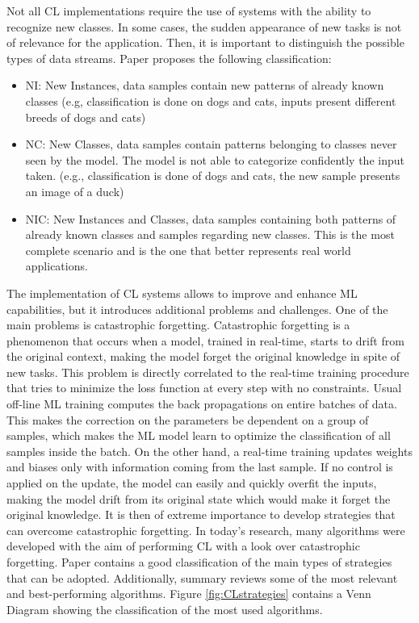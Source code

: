 \documentclass[12pt]{report}
\begin{document}
Not all CL implementations require the use of systems with the ability to recognize new classes. In some cases, the sudden appearance of new tasks is not of relevance for the application. Then, it is important to distinguish the possible types of data streams. Paper \cite{maltoni2019continuous} proposes the following classification:\\

\begin{itemize}
\item NI: New Instances, data samples contain new patterns of already known classes (e.g, classification is done on dogs and cats, inputs present different breeds of dogs and cats)
\item NC: New Classes, data samples contain patterns belonging to classes never seen by the model. The model is not able to categorize confidently the input taken. (e.g., classification is done of dogs and cats, the new sample presents an image of a duck)
\item NIC: New Instances and Classes, data samples containing both patterns of already known classes and samples regarding new classes. This is the most complete scenario and is the one that better represents real world applications.
\end{itemize}

The implementation of CL systems allows to improve and enhance ML capabilities, but it introduces additional problems and challenges. One of the main problems is catastrophic forgetting. Catastrophic forgetting \cite{french1999catastrophic} is a phenomenon that occurs when a model, trained in real-time, starts to drift from the original context, making the model forget the original knowledge in spite of new tasks. This problem is directly correlated to the real-time training procedure that tries to minimize the loss function at every step with no constraints. Usual off-line ML training computes the back propagations on entire batches of data. This makes the correction on the parameters be dependent on a group of samples, which makes the ML model learn to optimize the classification of all samples inside the batch. On the other hand, a real-time training updates weights and biases only with information coming from the last sample. If no control is applied on the update, the model can easily and quickly overfit the inputs, making the model drift from its original state which would make it forget the original knowledge. It is then of extreme importance to develop strategies that can overcome catastrophic forgetting. In today's research, many algorithms were developed with the aim of performing CL with a look over catastrophic forgetting. Paper \cite{maltoni2019continuous} contains a good classification of the main types of strategies that can be adopted. Additionally, summary \cite{lesort2020continual} reviews some of the most relevant and best-performing algorithms. Figure \ref{fig:CLstrategies} contains a Venn Diagram showing the classification of the most used algorithms.
\\
\end{document}
